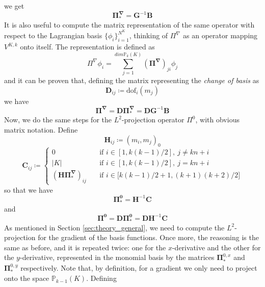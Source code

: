 \documentclass[10pt]{article}
\newcommand{\dof}{\text{dof}}
\newcommand{\mymatrix}[1]{\mathbf{#1}}
\begin{document}
we get
\begin{equation}
	\mymatrix{\Pi^\nabla_*}=\mymatrix{G}^{-1} \mymatrix{B}
\end{equation}
It is also useful to compute the matrix representation of the same operator with respect to the Lagrangian basis $\lbrace \phi_i \rbrace_{i=1}^{N^K}$, thinking of $\Pi^\nabla$ as an operator mapping $V^{K,k}$ onto itself. The representation is defined as
$$\Pi^\nabla \phi_i = \sum_{j=1}^{dim \mathbb{P}_k(K)} (\mymatrix{\Pi^\nabla})_{j i} \phi_j$$ and it can be proven that, defining the matrix representing the \textit{change of basis} as
\begin{equation}
\mymatrix{D}_{ij} \coloneqq \dof_i(m_j)
\end{equation}
we have
\begin{equation}
\mymatrix{\Pi^\nabla}=
\mymatrix{D} \mymatrix{\Pi^\nabla_*}=\mymatrix{D} \mymatrix{G}^{-1} \mymatrix{B}
\end{equation}
Now, we do the same steps for the $L^2$-projection operator $\Pi^0$, with obvious matrix notation. Define
\begin{equation}
	\mymatrix{H}_{ij} \coloneqq (m_i,m_j)_0	
\end{equation}
\begin{equation}
\mymatrix{C}_{ij} \coloneqq
\begin{cases}
0 \quad &\mbox{if $i \in [1,k(k-1)/2], \ j\neq kn+i$} \\
|K| \quad &\mbox{if $i \in [1,k(k-1)/2], \ j= kn+i$} \\
(\mymatrix{H}\mymatrix{\Pi^\nabla_*})_{ij}\quad &\mbox{if $i \in \lbrack k(k-1)/2+1, (k+1)(k+2)/2 \rbrack$}
\end{cases}	
\end{equation}
so that we have 
\begin{equation}
\mymatrix{\Pi^0_*}=\mymatrix{H}^{-1} \mymatrix{C}
\end{equation}
and
\begin{equation}
\mymatrix{\Pi^0}=
\mymatrix{D} \mymatrix{\Pi^0_*}=\mymatrix{D} \mymatrix{H}^{-1} \mymatrix{C}
\end{equation}
As mentioned in Section \ref{sec:theory_general}, we need to compute the $L^2$-projection for the gradient of the basis functions. Once more, the reasoning is the same as before, and it is repeated twice: one for the $x$-derivative and the other for the $y$-derivative, represented in the monomial basis by the matrices $\mymatrix{\Pi}_*^{0,x}$ and $\mymatrix{\Pi}_*^{0,y}$ respectively. Note that, by definition, for a gradient we only need to project onto the space $\mathbb{P}_{k-1}(K)$. Defining
\end{document}
